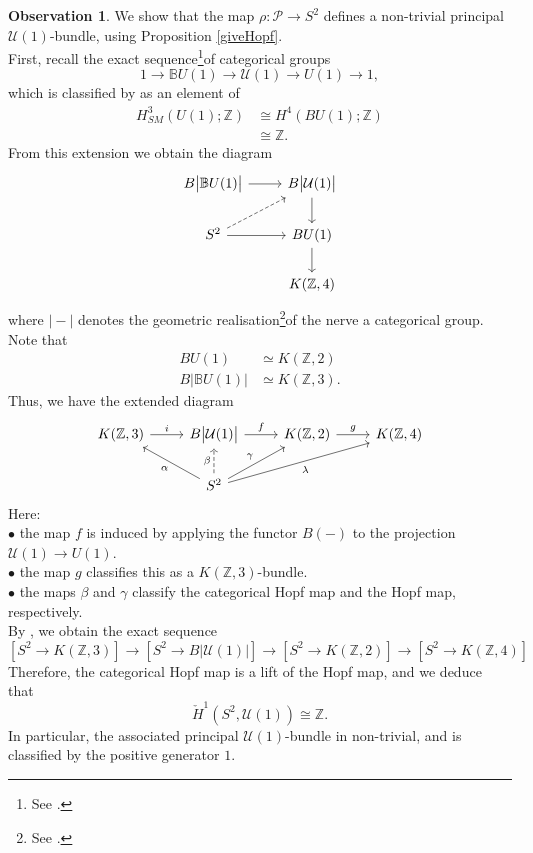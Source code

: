 \documentclass{article}
\theoremstyle{plain}
\theoremstyle{definition}
\newtheorem{obs}[thm]{Observation}
\begin{document}
\begin{obs}\label{nontri2bun}
We show that the map $\rho:\mathcal{P} \longrightarrow S^2$ defines a non-trivial principal $\mathcal{U}(1)$-bundle, using Proposition \ref{giveHopf}. \\
First, recall the exact sequence\footnote{See \cite{MR3764535}.}of categorical groups
\[
1 \longrightarrow \mathbb{B}U(1) \longrightarrow \mathcal{U}(1) \longrightarrow U(1) \longrightarrow 1,
\]
which is classified by \cite[Theorem 99 on page 662]{MR2800361} as an element of
\begin{align*}
H^3_{SM}(U(1);\mathbb{Z}) & \cong H^4(BU(1);\mathbb{Z}) \\
& \cong \mathbb{Z}.
\end{align*}
From this extension we obtain the diagram
\[
\begin{tikzcd}
B\big\vert \mathbb{B}U(1) \big\vert \arrow[r] & B \big\vert \mathcal{U}(1) \big\vert \arrow[d] \\
S^2 \arrow[ur,dashed] \arrow[r] & BU(1) \arrow[d] \\
& K(\mathbb{Z},4)
\end{tikzcd}
\]
where $\big\vert - \big\vert$ denotes the geometric realisation\footnote{See \cite{MR2597732}.}of the nerve a categorical group. \\
Note that
\begin{align*}
BU(1) & \simeq K(\mathbb{Z},2) \\
B\big\vert \mathbb{B}U(1) \big\vert & \simeq K(\mathbb{Z},3).
\end{align*}
Thus, we have the extended diagram
\[
\begin{tikzcd}
K(\mathbb{Z},3) \arrow[r,"i"] & B \big\vert \mathcal{U}(1) \big\vert \arrow[r,"f"] & K(\mathbb{Z},2) \arrow[r,"g"] & K(\mathbb{Z},4) \\
& S^2 \arrow[ul,"\alpha"] \arrow[u,dashed,"\beta"] \arrow[ur,"\gamma"] \arrow[urr,"\lambda"'] & & 
\end{tikzcd}
\]
Here: \\
$\bullet$ the map $f$ is induced by applying the functor $B(-)$ to the projection $\mathcal{U}(1) \longrightarrow U(1)$. \\
$\bullet$ the map $g$ classifies this as a $K(\mathbb{Z},3)$-bundle. \\
$\bullet$ the maps $\beta$ and $\gamma$ classify the categorical Hopf map and the Hopf map, respectively. \\
By \cite[Lemma 3 on page 17]{MR2597732}, we obtain the exact sequence
\[
[S^2 \longrightarrow K(\mathbb{Z},3)] \longrightarrow [S^2 \longrightarrow B\big\vert\mathcal{U}(1)\big\vert] \longrightarrow [S^2 \longrightarrow K(\mathbb{Z},2)] \longrightarrow [S^2 \longrightarrow K(\mathbb{Z},4)]
\]
Therefore, the categorical Hopf map is a lift of the Hopf map, and we deduce that
\[
\check{H}^1(S^2,\mathcal{U}(1)) \cong \mathbb{Z}.
\]
In particular, the associated principal $\mathcal{U}(1)$-bundle in non-trivial, and is classified by the positive generator $1$.
\end{obs}
\end{document}
